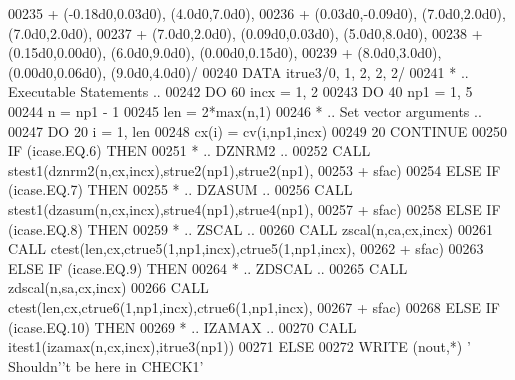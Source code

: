 \begin{DoxyCode}
00235      +                  (-0.18d0,0.03d0), (4.0d0,7.0d0),
00236      +                  (0.03d0,-0.09d0), (7.0d0,2.0d0), (7.0d0,2.0d0),
00237      +                  (7.0d0,2.0d0), (0.09d0,0.03d0), (5.0d0,8.0d0),
00238      +                  (0.15d0,0.00d0), (6.0d0,9.0d0), (0.00d0,0.15d0),
00239      +                  (8.0d0,3.0d0), (0.00d0,0.06d0), (9.0d0,4.0d0)/
00240       \textcolor{keyword}{DATA}              itrue3/0, 1, 2, 2, 2/
00241 \textcolor{comment}{*     .. Executable Statements ..}
00242       \textcolor{keywordflow}{DO} 60 incx = 1, 2
00243          \textcolor{keywordflow}{DO} 40 np1 = 1, 5
00244             n = np1 - 1
00245             len = 2*max(n,1)
00246 \textcolor{comment}{*           .. Set vector arguments ..}
00247             \textcolor{keywordflow}{DO} 20 i = 1, len
00248                cx(i) = cv(i,np1,incx)
00249    20       \textcolor{keywordflow}{CONTINUE}
00250             \textcolor{keywordflow}{IF} (icase.EQ.6) \textcolor{keywordflow}{THEN}
00251 \textcolor{comment}{*              .. DZNRM2 ..}
00252                \textcolor{keyword}{CALL }stest1(dznrm2(n,cx,incx),strue2(np1),strue2(np1),
00253      +                     sfac)
00254             \textcolor{keywordflow}{ELSE} \textcolor{keywordflow}{IF} (icase.EQ.7) \textcolor{keywordflow}{THEN}
00255 \textcolor{comment}{*              .. DZASUM ..}
00256                \textcolor{keyword}{CALL }stest1(dzasum(n,cx,incx),strue4(np1),strue4(np1),
00257      +                     sfac)
00258             \textcolor{keywordflow}{ELSE} \textcolor{keywordflow}{IF} (icase.EQ.8) \textcolor{keywordflow}{THEN}
00259 \textcolor{comment}{*              .. ZSCAL ..}
00260                \textcolor{keyword}{CALL }zscal(n,ca,cx,incx)
00261                \textcolor{keyword}{CALL }ctest(len,cx,ctrue5(1,np1,incx),ctrue5(1,np1,incx),
00262      +                    sfac)
00263             \textcolor{keywordflow}{ELSE} \textcolor{keywordflow}{IF} (icase.EQ.9) \textcolor{keywordflow}{THEN}
00264 \textcolor{comment}{*              .. ZDSCAL ..}
00265                \textcolor{keyword}{CALL }zdscal(n,sa,cx,incx)
00266                \textcolor{keyword}{CALL }ctest(len,cx,ctrue6(1,np1,incx),ctrue6(1,np1,incx),
00267      +                    sfac)
00268             \textcolor{keywordflow}{ELSE} \textcolor{keywordflow}{IF} (icase.EQ.10) \textcolor{keywordflow}{THEN}
00269 \textcolor{comment}{*              .. IZAMAX ..}
00270                \textcolor{keyword}{CALL }itest1(izamax(n,cx,incx),itrue3(np1))
00271             \textcolor{keywordflow}{ELSE}
00272                \textcolor{keyword}{WRITE} (nout,*) \textcolor{stringliteral}{' Shouldn'}\textcolor{stringliteral}{'t be here in CHECK1'}

\end{DoxyCode}
